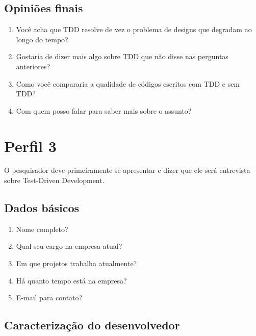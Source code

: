 \subsection{Opiniões finais}

\begin{enumerate}
	\item Você acha que TDD resolve de vez o problema de designs que degradam ao longo do tempo?

	\item Gostaria de dizer mais algo sobre TDD que não disse nas perguntas anteriores?
	
	\item Como você compararia a qualidade de códigos escritos com TDD e sem TDD? 

	\item Com quem posso falar para saber mais sobre o assunto?
\end{enumerate}


\section{Perfil 3}

O pesquisador deve primeiramente se apresentar e dizer que ele será entrevista
sobre Test-Driven Development.

\subsection{Dados básicos}

\begin{enumerate}
	\item Nome completo?

	\item Qual seu cargo na empresa atual?
	
	\item Em que projetos trabalha atualmente?
	
	\item Há quanto tempo está na empresa?

	\item E-mail para contato?

\end{enumerate}

\subsection{Caracterização do desenvolvedor}


